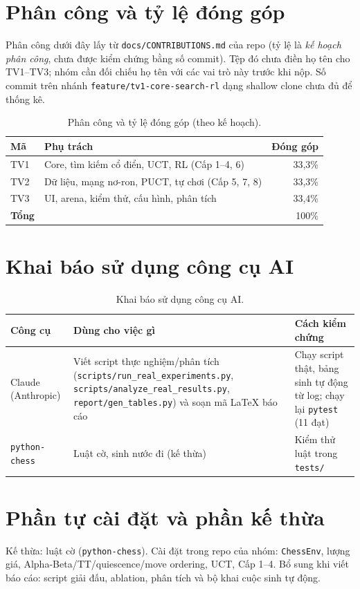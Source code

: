 \documentclass[13pt,a4paper]{extreport}
\newcommand{\code}[1]{\texttt{#1}}
\begin{document}
\section{Phân công và tỷ lệ đóng góp}
Phân công dưới đây lấy từ \code{docs/CONTRIBUTIONS.md} của repo (tỷ lệ là \emph{kế hoạch phân công}, chưa được kiểm chứng bằng số commit). Tệp đó chưa điền họ tên cho TV1--TV3; nhóm cần đối chiếu họ tên với các vai trò này trước khi nộp. Số commit trên nhánh \code{feature/tv1-core-search-rl} dạng shallow clone chưa đủ để thống kê.
\begin{table}[H]\centering\small
\caption{Phân công và tỷ lệ đóng góp (theo kế hoạch).}
\begin{tabularx}{\textwidth}{l Y r}\toprule Mã & Phụ trách & Đóng góp\\\midrule
TV1 & Core, tìm kiếm cổ điển, UCT, RL (Cấp 1--4, 6) & 33,3\%\\
TV2 & Dữ liệu, mạng nơ-ron, PUCT, tự chơi (Cấp 5, 7, 8) & 33,3\%\\
TV3 & UI, arena, kiểm thử, cấu hình, phân tích & 33,4\%\\\midrule
\textbf{Tổng} & & 100\%\\\bottomrule\end{tabularx}\end{table}
\section{Khai báo sử dụng công cụ AI}
\begin{table}[H]\centering\small
\caption{Khai báo sử dụng công cụ AI.}
\begin{tabularx}{\textwidth}{l Y Y}\toprule Công cụ & Dùng cho việc gì & Cách kiểm chứng\\\midrule
Claude (Anthropic) & Viết script thực nghiệm/phân tích (\code{scripts/run\_real\_experiments.py}, \code{scripts/analyze\_real\_results.py}, \code{report/gen\_tables.py}) và soạn mã LaTeX báo cáo & Chạy script thật, bảng sinh tự động từ log; chạy lại \code{pytest} (11 đạt)\\
\texttt{python-chess} & Luật cờ, sinh nước đi (kế thừa) & Kiểm thử luật trong \code{tests/}\\
\bottomrule\end{tabularx}\end{table}
\section{Phần tự cài đặt và phần kế thừa}
Kế thừa: luật cờ (\code{python-chess}). Cài đặt trong repo của nhóm: \code{ChessEnv}, lượng giá, Alpha-Beta/TT/quiescence/move ordering, UCT, Cấp 1--4. Bổ sung khi viết báo cáo: script giải đấu, ablation, phân tích và bộ khai cuộc sinh tự động.
\end{document}

